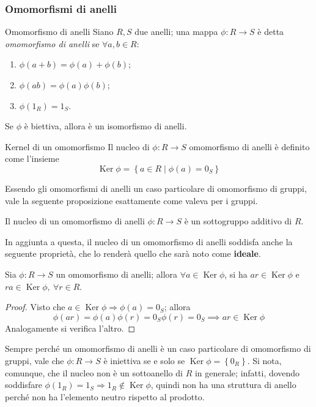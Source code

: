 \documentclass[11pt, a4paper]{scrartcl}
\theoremstyle{definition}
\numberwithin{esempio}{section}
\theoremstyle{definition}
\numberwithin{obs}{section}
\numberwithin{nota}{section}
\numberwithin{equation}{subsection}
\begin{document}
\subsubsection{Omomorfismi di anelli}
\begin{definizione}
	{Omomorfismo di anelli}{}
	Siano $R,S$ due anelli; una mappa $\phi :R \to S$ \`e detta \textit{omomorfismo di anelli} se $\forall a,b \in R$:
	\begin{enumerate}[(or 1).]
		\item $\phi (a+b) = \phi (a) + \phi (b)$;
		\item $\phi (ab) = \phi (a)\phi (b)$;
		\item $\phi (1_R) = 1_S$.
	\end{enumerate}
	Se $\phi $ \`e biettiva, allora \`e un isomorfismo di anelli.
\end{definizione}
\begin{definizione}
	{Kernel di un omomorfismo}{}
	Il nucleo di $\phi :R\to S$ omomorfismo di anelli \`e definito come l'insieme
	\[
	\operatorname{Ker} \phi = \left\{ a \in R  \mid \phi (a) = 0 _S \right\} 
	\] 
\end{definizione}
\noindent Essendo gli omomorfismi di anelli un caso particolare di omomorfismo di gruppi, vale la seguente proposizione esattamente come valeva per i gruppi.
\begin{prop}
	{}{}
	Il nucleo di un omomorfismo di anelli $\phi : R\to S$ \`e un sottogruppo additivo di $R$.
\end{prop}
\noindent In aggiunta a questa, il nucleo di un omomorfismo di anelli soddisfa anche la seguente propriet\`a, che lo render\`a quello che sar\`a noto come \textbf{ideale}.
\begin{prop}
	{}{}
	Sia $\phi :R \to S$ un omomorfismo di anelli; allora $\forall a \in \operatorname{Ker} \phi $, si ha $ar \in \operatorname{Ker} \phi $ e $ra \in \operatorname{Ker} \phi , \ \forall r \in R$.
	\begin{proof}
		Visto che $a \in \operatorname{Ker} \phi \Rightarrow \phi (a) = 0_S$; allora 
		\[
		\phi (ar) = \phi (a) \phi (r) = 0_S \phi (r) = 0_S \implies ar \in \operatorname{Ker} \phi 
		\] 
		Analogamente si verifica l'altro.
	\end{proof}
\end{prop}
\noindent Sempre perch\'e un omomorfismo di anelli \`e un caso particolare di omomorfismo di gruppi, vale che $\phi:R\to S $ \`e iniettiva se e solo se $\operatorname{Ker} \phi  = \left\{ 0_R \right\} $.
Si nota, comunque, che il nucleo non \`e un sottoanello di $R$ in generale; infatti, dovendo soddisfare $\phi (1_R) = 1_S \Rightarrow 1_R \not\in \operatorname{Ker} \phi $, quindi non ha una struttura di anello perch\'e non ha l'elemento neutro rispetto al prodotto.
\end{document}

